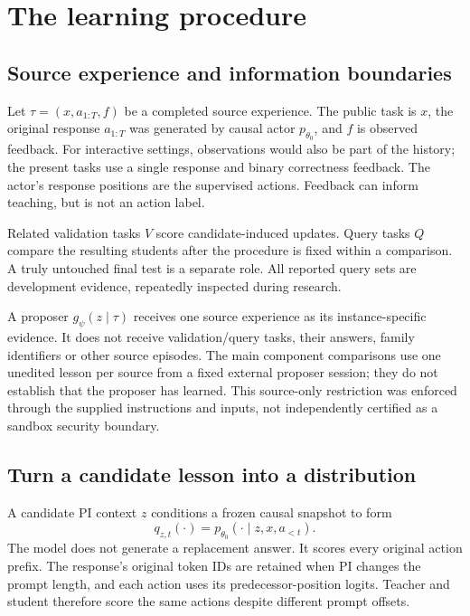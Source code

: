 \documentclass[11pt,letterpaper]{article}
\begin{document}
\section{The learning procedure}
\label{sec:method}



\subsection{Source experience and information boundaries}

Let $\tau=(x,a_{1:T},f)$ be a completed source experience. The public task is $x$, the original response $a_{1:T}$ was generated by causal actor $p_{\theta_0}$, and $f$ is observed feedback. For interactive settings, observations would also be part of the history; the present tasks use a single response and binary correctness feedback. The actor's response positions are the supervised actions. Feedback can inform teaching, but is not an action label.

Related validation tasks $V$ score candidate-induced updates. Query tasks $Q$ compare the resulting students after the procedure is fixed within a comparison. A truly untouched final test is a separate role. All reported query sets are development evidence, repeatedly inspected during research.

A proposer $g_\psi(z\mid\tau)$ receives one source experience as its instance-specific evidence. It does not receive validation/query tasks, their answers, family identifiers or other source episodes. The main component comparisons use one unedited lesson per source from a fixed external proposer session; they do not establish that the proposer has learned. This source-only restriction was enforced through the supplied instructions and inputs, not independently certified as a sandbox security boundary.

\subsection{Turn a candidate lesson into a distribution}

A candidate PI context $z$ conditions a frozen causal snapshot to form
\begin{equation}
q_{z,t}(\cdot)=p_{\theta_0}(\cdot\mid z,x,a_{<t}).
\label{eq:pi}
\end{equation}
The model does not generate a replacement answer. It scores every original action prefix. The response's original token IDs are retained when PI changes the prompt length, and each action uses its predecessor-position logits. Teacher and student therefore score the same actions despite different prompt offsets.
\end{document}
